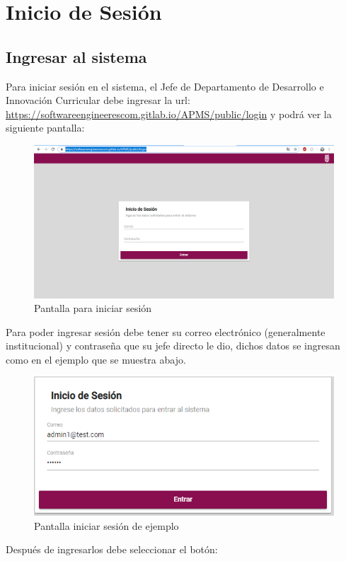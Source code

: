 \section{Inicio de Sesión}

    \subsection{Ingresar al sistema}
        Para iniciar sesión en el sistema, el Jefe de Departamento de Desarrollo e Innovación Curricular debe ingresar la url: \url{https://softwareengineerescom.gitlab.io/APMS/public/login} y podrá ver la siguiente pantalla:

        \begin{figure}[H]
            \centering
            \hypertarget{iniciarS}{\includegraphics[width=0.7\linewidth]{images/SP5/IniciarSesion}}
            \caption{Pantalla para iniciar sesión}
        \end{figure}
        \clearpage
        Para poder ingresar sesión debe tener su correo electrónico (generalmente institucional) y contraseña que su jefe directo le dio, dichos datos se ingresan como en el ejemplo que se muestra abajo.

        \begin{figure}[H]
            \centering
            \hypertarget{iniciarL}{\includegraphics[width=0.5\linewidth]{images/SP5/ejemploIniciar}}
            \caption{Pantalla iniciar sesión de ejemplo}
        \end{figure}

        Después de ingresarlos debe seleccionar el botón:

